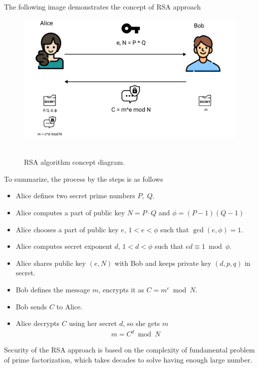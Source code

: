 The following image demonstrates the concept of RSA approach
\begin{figure}[H]
    \centering
    \includegraphics[width=1\textwidth]{img/RSA}
    ~\caption{RSA algorithm concept diagram.}
    \label{fig:rsa-algorithm}
\end{figure}
To summarize, the process by the steps is as follows
\begin{itemize}
    \item Alice defines two secret prime numbers $P, \; Q$.
    \item Alice computes a part of public key $N = P \cdot Q$ and $\phi = (P-1)(Q-1)$
    \item Alice chooses a part of public key $e$, $1<e< \phi$ such that $\gcd(e, \phi) = 1$.
    \item Alice computes secret exponent $d$, $1<d< \phi$ such that $ed \equiv 1 \bmod \phi$.
    \item Alice shares public key $(e, N)$ with Bob and keeps private key $(d, p, q)$ in secret.
    \item Bob defines the message $m$, encrypts it as $C = m^{e} \bmod N$.
    \item Bob sends $C$ to Alice.
    \item Alice decrypts $C$ using her secret $d$, so she gets $m$
    \begin{align*}
        m = C^d \bmod N
    \end{align*}
\end{itemize}
Security of the RSA approach is based on the complexity of fundamental problem of prime factorization,
which takes decades to solve having enough large number.
